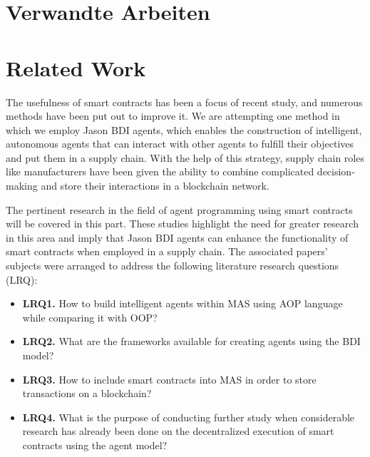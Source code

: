 {\chapter{Verwandte Arbeiten}}
{\chapter{Related Work}}
\label{sec:related}

The usefulness of smart contracts has been a focus of recent study, and numerous methods have been put out to improve it. We are attempting one method in which we employ Jason \ac{BDI} agents, which enables the construction of intelligent, autonomous agents that can interact with other agents to fulfill their objectives and put them in a supply chain. With the help of this strategy, supply chain roles like manufacturers have been given the ability to combine complicated decision-making and store their interactions in a blockchain network.

\vspace{.5cm}

The pertinent research in the field of agent programming using smart contracts will be covered in this part. These studies highlight the need for greater research in this area and imply that Jason \ac{BDI} agents can enhance the functionality of smart contracts when employed in a supply chain. The associated papers' subjects were arranged to address the following literature research questions (LRQ): 
\begin{itemize}[label={}]
    \item \textbf{LRQ1.} How to build intelligent agents within \ac{MAS} using \ac{AOP} language while comparing it with \ac{OOP}? \\

    \item \textbf{LRQ2.} What are the frameworks available for creating agents using the \ac{BDI} model?\\
    
    \item \textbf{LRQ3.} How to include smart contracts into \ac{MAS} in order to store transactions on a blockchain?\\

    \item \textbf{LRQ4.} What is the purpose of conducting further study when considerable research has already been done on the decentralized execution of smart contracts using the agent model?

\end{itemize}


